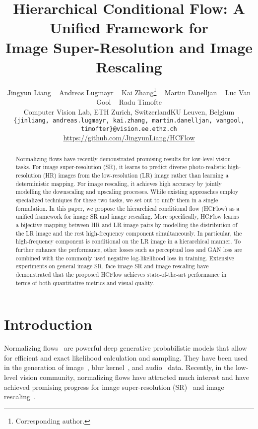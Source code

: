 \documentclass[10pt,twocolumn,letterpaper]{article}
\begin{document}
\title{Hierarchical Conditional Flow: A Unified Framework for \\Image Super-Resolution and Image Rescaling}
\author{\hspace{-0.3cm}Jingyun Liang ~ Andreas Lugmayr ~ Kai Zhang\thanks{Corresponding author.} ~ Martin Danelljan ~ Luc Van Gool ~ Radu Timofte\\
Computer Vision Lab, ETH Zurich, Switzerland\quad  KU Leuven, Belgium\\
{\tt\small \hspace{-0.6cm}\{jinliang, andreas.lugmayr, kai.zhang, martin.danelljan, vangool, timofter\}@vision.ee.ethz.ch}\\ 
{\tt\small }\url{https://github.com/JingyunLiang/HCFlow}
}

\maketitle


\begin{abstract}
Normalizing flows have recently demonstrated promising results for low-level vision tasks. For image super-resolution (SR), it learns to predict diverse photo-realistic high-resolution (HR) images from the low-resolution (LR) image rather than learning a deterministic mapping. For image rescaling, it achieves high accuracy by jointly modelling the downscaling and upscaling processes. While existing approaches employ specialized techniques for these two tasks, we set out to unify them in a single formulation. In this paper, we propose the hierarchical conditional flow (HCFlow) as a unified framework for image SR and image rescaling. More specifically, HCFlow learns a bijective mapping between HR and LR image pairs by modelling the distribution of the LR image and the rest high-frequency component simultaneously. In particular, the high-frequency component is conditional on the LR image in a hierarchical manner. To further enhance the performance, other losses such as perceptual loss and GAN loss are combined with the commonly used negative log-likelihood loss in training. Extensive experiments on general image SR, face image SR and image rescaling have demonstrated that the proposed HCFlow achieves state-of-the-art performance in terms of both quantitative metrics and visual quality.
\end{abstract}



\section{Introduction}
Normalizing flows~\cite{dinh2014nice, dinh2016realnvp, kingma2018glow, ho2019flow++, jaini2019polyflow, nielsen2020survae} are powerful deep generative probabilistic models that allow for efficient and exact likelihood calculation and sampling. They have been used in the generation of image~\cite{dinh2016realnvp, kingma2018glow}, blur kernel~\cite{liang2021fkp}, and audio~\cite{kim2018flowavenet} data. Recently, in the low-level vision community, normalizing flows have attracted much interest and have achieved promising progress for image super-resolution (SR)~\cite{lugmayr2020srflow} and image rescaling~\cite{xiao2020IRN}.
\end{document}
